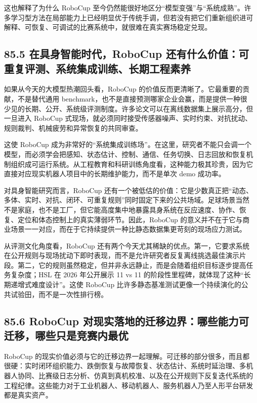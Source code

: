 这也解释了为什么 RoboCup 至今仍然能很好地区分“模型变强”与“系统成熟”。许多学习型方法在局部能力上已经明显优于传统手调，但若没有把它们重新组织进可解释、可恢复、可调试的比赛系统中，就很难在真实赛场稳定兑现。

\subsection*{85.5 在具身智能时代，RoboCup 还有什么价值：可重复评测、系统集成训练、长期工程素养}


如果从今天的大模型热潮回头看，RoboCup 的价值反而更清晰了。它最重要的贡献，不是替代通用 benchmark，也不是直接预测哪家企业会赢，而是提供一种很少见的长期、公开、系统级评测制度。许多论文可以在离线数据集上展示高分，但一旦进入 RoboCup 式现场，就必须同时接受传感器噪声、实时约束、对抗扰动、规则裁判、机械疲劳和异常恢复的共同审查。

这使 RoboCup 成为非常好的“系统集成训练场”。在这里，研究者不能只会调一个模型，而必须学会把感知、状态估计、控制、通信、任务切换、日志回放和恢复机制组织成可运行系统。从工程教育和科研训练角度看，这种能力极其珍贵，因为它直接对应现实机器人项目中的长期维护能力，而不是单次 demo 成功率。

对具身智能研究而言，RoboCup 还有一个被低估的价值：它是少数真正把“动态、多体、实时、对抗、闭环、可重复规则”同时固定下来的公共场域。足球场景当然不是家庭，也不是工厂，但它能高度集中地暴露具身系统在反应速度、协作、恢复、定位和体态控制上的真实薄弱环节。因此，RoboCup 的意义并不在于它与商业场景一一对应，而在于它持续提供一种比静态数据集更苛刻的现场应力测试。

从评测文化角度看，RoboCup 还有两个今天尤其稀缺的优点。第一，它要求系统在公开规则与现场扰动下即时表现，而不是允许研究者反复离线挑选最佳演示片段。第二，它的规则虽然稳定，但并非永远静止，而是会随着组织目标逐步提高任务复杂度；HSL 在 2026 年公开展示 11 vs 11 的阶段性里程碑，就体现了这种“长期递增式难度设计”。这使 RoboCup 比许多静态基准测试更像一个持续演化的公共试验田，而不是一次性排行榜。

\subsection*{85.6 RoboCup 对现实落地的迁移边界：哪些能力可迁移，哪些只是竞赛内最优}


RoboCup 的现实价值必须与它的迁移边界一起理解。可迁移的部分很多，而且都很硬：实时闭环组织能力、跌倒恢复与故障恢复、状态估计、系统时延治理、多机器人协同、比赛级日志分析、仿真到真机校准、以及在公开规则下反复迭代系统的工程纪律。这些能力对于工业机器人、移动机器人、服务机器人乃至人形平台研发都是真实资产。

